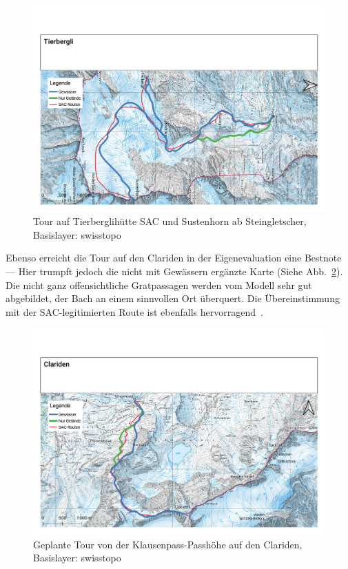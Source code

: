 \begin{figure}[ht]
  \centering
  \includegraphics[page=1,width=.9\linewidth]{./../evaluation/PDFs/Tierbergli.pdf}
  \caption{Tour auf Tierberglihütte SAC und Sustenhorn ab Steingletscher, \\Basislayer: swisstopo}\label{fig:tierbergli}
\end{figure}


Ebenso erreicht die Tour auf den Clariden in der Eigenevaluation eine Bestnote --- Hier trumpft jedoch die nicht mit Gewässern ergänzte Karte (Siehe Abb.\ \ref{fig:clariden}). Die nicht ganz offensichtliche Gratpassagen werden vom Modell sehr gut abgebildet, der Bach an einem sinnvollen Ort überquert. Die Übereinstimmung mit der SAC-legitimierten Route ist ebenfalls hervorragend~\cite{twslstgallappzll}.

\begin{figure}[ht]
  \centering
  \includegraphics[page=1,width=.9\linewidth]{./../evaluation/PDFs/Clariden.pdf}
  \caption{Geplante Tour von der Klausenpass-Passhöhe auf den Clariden, \\Basislayer: swisstopo}\label{fig:clariden}
\end{figure}

